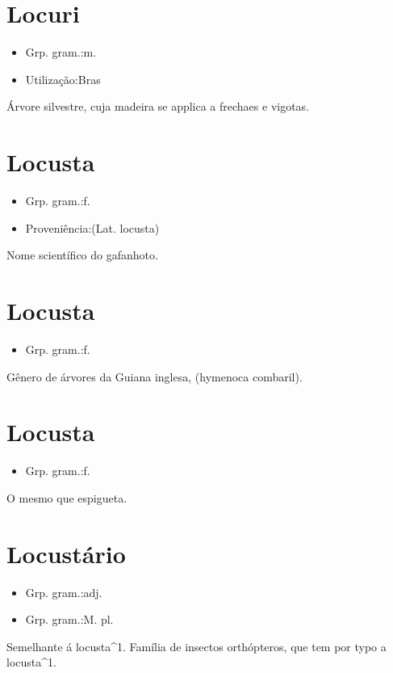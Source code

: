 \section{Locuri}
\begin{itemize}
\item {Grp. gram.:m.}
\end{itemize}
\begin{itemize}
\item {Utilização:Bras}
\end{itemize}
Árvore silvestre, cuja madeira se applica a frechaes e vigotas.
\section{Locusta}
\begin{itemize}
\item {Grp. gram.:f.}
\end{itemize}
\begin{itemize}
\item {Proveniência:(Lat. \textunderscore locusta\textunderscore )}
\end{itemize}
Nome scientífico do gafanhoto.
\section{Locusta}
\begin{itemize}
\item {Grp. gram.:f.}
\end{itemize}
Gênero de árvores da Guiana inglesa, (\textunderscore hymenoca combaril\textunderscore ).
\section{Locusta}
\begin{itemize}
\item {Grp. gram.:f.}
\end{itemize}
O mesmo que \textunderscore espigueta\textunderscore .
\section{Locustário}
\begin{itemize}
\item {Grp. gram.:adj.}
\end{itemize}
\begin{itemize}
\item {Grp. gram.:M. pl.}
\end{itemize}
Semelhante á locusta^1.
Família de insectos orthópteros, que tem por typo a locusta^1.
